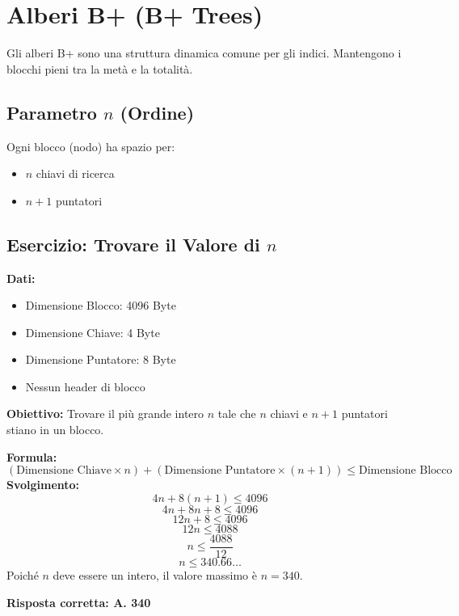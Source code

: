 \section{Alberi B+ (B+ Trees)}
Gli alberi B+ sono una struttura dinamica comune per gli indici. Mantengono i blocchi pieni tra la metà e la totalità.

\subsection{Parametro \texorpdfstring{$n$}{n} (Ordine)}
Ogni blocco (nodo) ha spazio per:
\begin{itemize}
    \item $n$ chiavi di ricerca
    \item $n+1$ puntatori
\end{itemize}

\subsection{Esercizio: Trovare il Valore di \texorpdfstring{$n$}{n}}
\textbf{Dati:}
\begin{itemize}
    \item Dimensione Blocco: 4096 Byte
    \item Dimensione Chiave: 4 Byte
    \item Dimensione Puntatore: 8 Byte
    \item Nessun header di blocco
\end{itemize}
\textbf{Obiettivo:} Trovare il più grande intero $n$ tale che $n$ chiavi e $n+1$ puntatori stiano in un blocco.

\textbf{Formula:}
\[ (\text{Dimensione Chiave} \times n) + (\text{Dimensione Puntatore} \times (n+1)) \leq \text{Dimensione Blocco} \]
\textbf{Svolgimento:}
\[ 4n + 8(n+1) \leq 4096 \]
\[ 4n + 8n + 8 \leq 4096 \]
\[ 12n + 8 \leq 4096 \]
\[ 12n \leq 4088 \]
\[ n \leq \frac{4088}{12} \]
\[ n \leq 340.66\ldots \]
Poiché $n$ deve essere un intero, il valore massimo è $n = 340$.

\textbf{Risposta corretta: A. 340}

